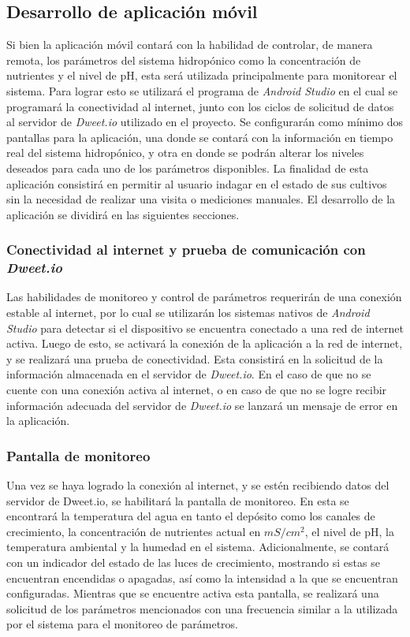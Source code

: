 \subsection*{Desarrollo de aplicación móvil}
Si bien la aplicación móvil contará con la habilidad de controlar, de manera remota, los parámetros del sistema hidropónico como la concentración de nutrientes y el nivel de pH, esta será utilizada principalmente para monitorear el sistema. Para lograr esto se utilizará el programa de \textit{Android Studio} en el cual se programará la conectividad al internet, junto con los ciclos de solicitud de datos al servidor de \textit{Dweet.io} utilizado en el proyecto. Se configurarán como mínimo dos pantallas para la aplicación, una donde se contará con la información en tiempo real del sistema hidropónico, y otra en donde se podrán alterar los niveles deseados para cada uno de los parámetros disponibles. La finalidad de esta aplicación consistirá en permitir al usuario indagar en el estado de sus cultivos sin la necesidad de realizar una visita o mediciones manuales. El desarrollo de la aplicación se dividirá en las siguientes secciones.

\subsubsection{Conectividad al internet y prueba de comunicación con \textit{Dweet.io}}
Las habilidades de monitoreo y control de parámetros requerirán de una conexión estable al internet, por lo cual se utilizarán los sistemas nativos de \textit{Android Studio} para detectar si el dispositivo se encuentra conectado a una red de internet activa. Luego de esto, se activará la conexión de la aplicación a la red de internet, y se realizará una prueba de conectividad. Esta consistirá en la solicitud de la información almacenada en el servidor de \textit{Dweet.io}. En el caso de que no se cuente con una conexión activa al internet, o en caso de que no se logre recibir información adecuada del servidor de \textit{Dweet.io} se lanzará un mensaje de error en la aplicación.

\subsubsection{Pantalla de monitoreo}
Una vez se haya logrado la conexión al internet, y se estén recibiendo datos del servidor de Dweet.io, se habilitará la pantalla de monitoreo. En esta se encontrará la temperatura del agua en tanto el depósito como los canales de crecimiento, la concentración de nutrientes actual en $mS/cm^2$, el nivel de pH, la temperatura ambiental y la humedad en el sistema. Adicionalmente, se contará con un indicador del estado de las luces de crecimiento, mostrando si estas se encuentran encendidas o apagadas, así como la intensidad a la que se encuentran configuradas. Mientras que se encuentre activa esta pantalla, se realizará una solicitud de los parámetros mencionados con una frecuencia similar a la utilizada por el sistema para el monitoreo de parámetros.

